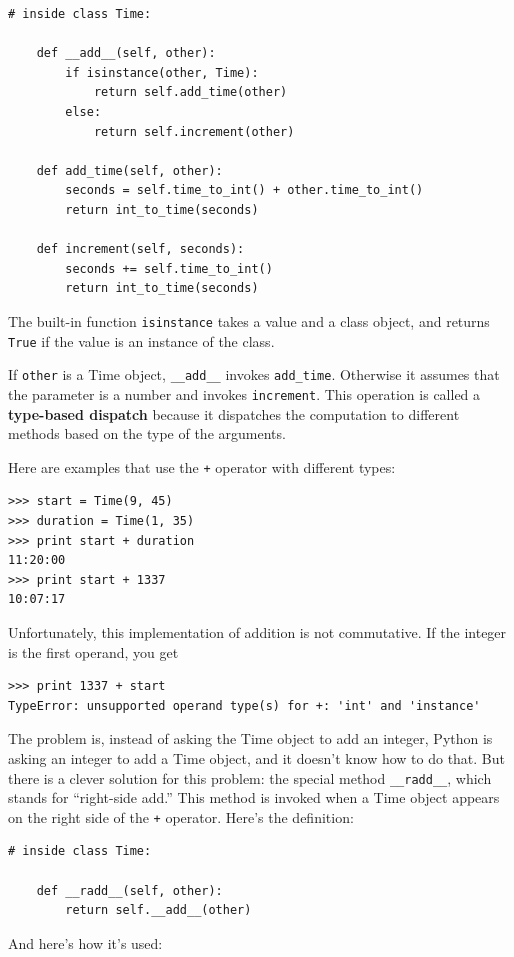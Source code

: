 \documentclass[10pt]{book}
\begin{document}
\begin{verbatim}
# inside class Time:

    def __add__(self, other):
        if isinstance(other, Time):
            return self.add_time(other)
        else:
            return self.increment(other)

    def add_time(self, other):
        seconds = self.time_to_int() + other.time_to_int()
        return int_to_time(seconds)

    def increment(self, seconds):
        seconds += self.time_to_int()
        return int_to_time(seconds)
\end{verbatim}
%
The built-in function {\tt isinstance} takes a value and a
class object, and returns {\tt True} if the value is an instance
of the class.

If {\tt other} is a Time object, \verb"__add__" invokes
\verb"add_time".  Otherwise it assumes that the parameter
is a number and invokes {\tt increment}.  This operation is
called a {\bf type-based dispatch} because it dispatches the
computation to different methods based on the type of the
arguments.

Here are examples that use the {\tt +} operator with different
types:

\begin{verbatim}
>>> start = Time(9, 45)
>>> duration = Time(1, 35)
>>> print start + duration
11:20:00
>>> print start + 1337
10:07:17
\end{verbatim}
%
Unfortunately, this implementation of addition is not commutative.
If the integer is the first operand, you get

\begin{verbatim}
>>> print 1337 + start
TypeError: unsupported operand type(s) for +: 'int' and 'instance'
\end{verbatim}
%
The problem is, instead of asking the Time object to add an integer,
Python is asking an integer to add a Time object, and it doesn't know
how to do that.  But there is a clever solution for this problem: the
special method \verb"__radd__", which stands for ``right-side add.''
This method is invoked when a Time object appears on the right side of
the {\tt +} operator.  Here's the definition:

\begin{verbatim}
# inside class Time:

    def __radd__(self, other):
        return self.__add__(other)
\end{verbatim}
%
And here's how it's used:
\end{document}
